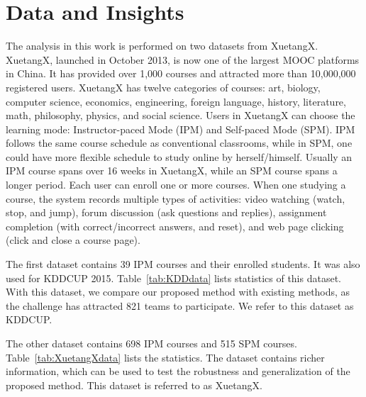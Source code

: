



\section{Data and Insights}

The analysis in this work is performed on two datasets from XuetangX.
XuetangX, launched in October 2013, is now one of the largest MOOC platforms in China.
It has provided over 1,000 courses and attracted more than 10,000,000 registered users.
XuetangX has twelve categories of courses: art, biology, computer science, economics, engineering, foreign language, history, literature, math, philosophy, physics, and social science. 
Users in XuetangX can choose the learning mode: Instructor-paced Mode (IPM) and {Self-paced Mode (SPM)}.  IPM   follows the same course schedule as conventional classrooms, while in SPM, one could have more flexible schedule to study online by herself/himself. Usually an IPM course spans over 16 weeks in XuetangX, while an SPM course spans a longer period.
Each user can enroll one or more courses. When one studying a course, the system records multiple types of activities: video watching (watch, stop, and jump), forum discussion (ask questions and replies), assignment completion (with correct/incorrect answers, and reset), and web page clicking (click and close a course page).

The first dataset contains 39 IPM  courses and their enrolled students. It
was also used for KDDCUP 2015. Table~\ref{tab:KDDdata} lists   statistics of this dataset. With this dataset, we compare our proposed method with existing methods, as the challenge has attracted 821 teams to participate.
We refer to this dataset as KDDCUP.

The other dataset contains 698 IPM courses and 515 SPM courses. Table~\ref{tab:XuetangXdata} lists  the statistics. The dataset contains richer information, which can be used to test the robustness and generalization of the proposed method.
This dataset is referred to as XuetangX.



